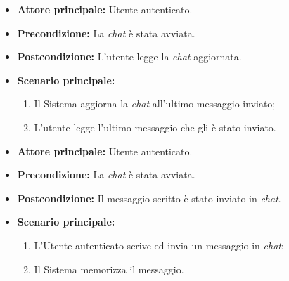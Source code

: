 \label{usecase:Lettura chat}
\begin{itemize}
	\item \textbf{Attore principale:} Utente autenticato.

	\item \textbf{Precondizione:} La \textit{chat} è stata avviata.

	\item \textbf{Postcondizione:} L'utente legge la \textit{chat} aggiornata.

	\item \textbf{Scenario principale:}
	      \begin{enumerate}
		      \item Il Sistema aggiorna la \textit{chat} all'ultimo messaggio inviato;
		      \item L'utente legge l'ultimo messaggio che gli è stato inviato.
	      \end{enumerate}
\end{itemize}


\label{usecase:Invio messaggio chat}
\begin{itemize}
	\item \textbf{Attore principale:} Utente autenticato.

	\item \textbf{Precondizione:} La \textit{chat} è stata avviata.


	\item \textbf{Postcondizione:} Il messaggio scritto è stato inviato in \textit{chat}.

	\item \textbf{Scenario principale:}
	      \begin{enumerate}
		      \item L'Utente autenticato scrive ed invia un messaggio in \textit{chat};
		      \item Il Sistema memorizza il messaggio.
	      \end{enumerate}
\end{itemize}
